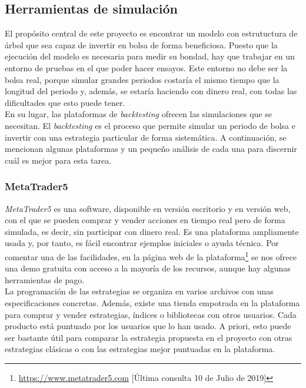 
	\subsection{Herramientas de simulaci\'on}		
	El prop\'osito central de este proyecto es encontrar un modelo con estrutuctura de \'arbol que sea capaz de invertir en bolsa de forma beneficiosa. Puesto que la ejecuci\'on del modelo es necesaria para medir su bondad, hay que trabajar en un entorno de pruebas en el que poder hacer ensayos. Este entorno no debe ser la bolsa real, porque simular grandes periodos costar\'ia el mismo tiempo que la longitud del periodo y, adem\'as, se estar\'ia haciendo con dinero real, con todas las dificultades que esto puede tener.\\
	
	En su lugar, las plataformas de \textit{backtesting} ofrecen las simulaciones que se necesitan. El \textit{backtesting} es el proceso que permite simular un periodo de bolsa e invertir con una estrategia particular de forma sistem\'atica. A continuaci\'on, se mencionan algunas plataformas y un peque\~no an\'alisis de cada una para discernir cu\'al es mejor para esta tarea.\\ 
	
	
		\subsubsection{MetaTrader5}
		
    	\textit{MetaTrader5} es una software, disponible en versi\'on escritorio y en versi\'on web, con el que se pueden comprar y vender acciones en tiempo real pero de forma simulada, es decir, sin participar con dinero real. Es una plataforma ampliamente usada y, por tanto, es f\'acil encontrar ejemplos iniciales o ayuda t\'ecnica. Por comentar una de las facilidades, en la p\'agina web de la plataforma\footnote{\url{https://www.metatrader5.com} [\'Ultima consulta 10 de Julio de 2019]} se nos ofrece una demo gratuita con acceso a la mayor\'ia de los recursos, aunque hay algunas herramientas de pago.\\
		
		La programaci\'on de las estrategias se organiza en varios archivos con unas especificaciones concretas. Adem\'as, existe una tienda empotrada en la plataforma para comprar y vender estrategias, \'indices o bibliotecas con otros usuarios. Cada producto est\'a puntuado por los usuarios que lo han usado. A priori, esto puede ser bastante \'util para comparar la estrategia propuesta en el proyecto con otras estrategias cl\'asicas o con las estrategias mejor puntuadas en la plataforma.\\
		
